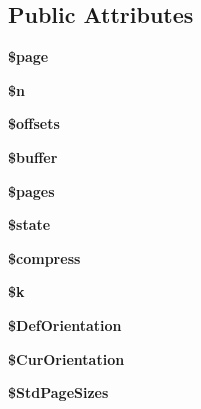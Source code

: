 \subsection*{Public Attributes}
\begin{DoxyCompactItemize}
\item 
\hypertarget{classFPDF_ab36ea1d04d26856c68ed3021b56eec5b}{{\bfseries \$page}}\label{classFPDF_ab36ea1d04d26856c68ed3021b56eec5b}

\item 
\hypertarget{classFPDF_a718a78c2c592d0a027429947df12d161}{{\bfseries \$n}}\label{classFPDF_a718a78c2c592d0a027429947df12d161}

\item 
\hypertarget{classFPDF_a15347dda89239d5fa79ead40a72e0e34}{{\bfseries \$offsets}}\label{classFPDF_a15347dda89239d5fa79ead40a72e0e34}

\item 
\hypertarget{classFPDF_aa5e639d922350949dc1a58a4597c58bb}{{\bfseries \$buffer}}\label{classFPDF_aa5e639d922350949dc1a58a4597c58bb}

\item 
\hypertarget{classFPDF_a43708e8b1a7d9c88f08982c4473d7767}{{\bfseries \$pages}}\label{classFPDF_a43708e8b1a7d9c88f08982c4473d7767}

\item 
\hypertarget{classFPDF_a8aef065fb2791fd919608521a801b7d3}{{\bfseries \$state}}\label{classFPDF_a8aef065fb2791fd919608521a801b7d3}

\item 
\hypertarget{classFPDF_a6effca6f281458983c61647878f6dc18}{{\bfseries \$compress}}\label{classFPDF_a6effca6f281458983c61647878f6dc18}

\item 
\hypertarget{classFPDF_adadc589358125e9865dc6565722b7a08}{{\bfseries \$k}}\label{classFPDF_adadc589358125e9865dc6565722b7a08}

\item 
\hypertarget{classFPDF_ad1640384fda9ee53cf7295eb823a31dc}{{\bfseries \$\+Def\+Orientation}}\label{classFPDF_ad1640384fda9ee53cf7295eb823a31dc}

\item 
\hypertarget{classFPDF_a40250e931a9dd32601bbe2a5a1eaf492}{{\bfseries \$\+Cur\+Orientation}}\label{classFPDF_a40250e931a9dd32601bbe2a5a1eaf492}

\item 
\hypertarget{classFPDF_a8cfbaabd6e5ec70a7d074323f2295a41}{{\bfseries \$\+Std\+Page\+Sizes}}\label{classFPDF_a8cfbaabd6e5ec70a7d074323f2295a41}


\end{DoxyCompactItemize}
